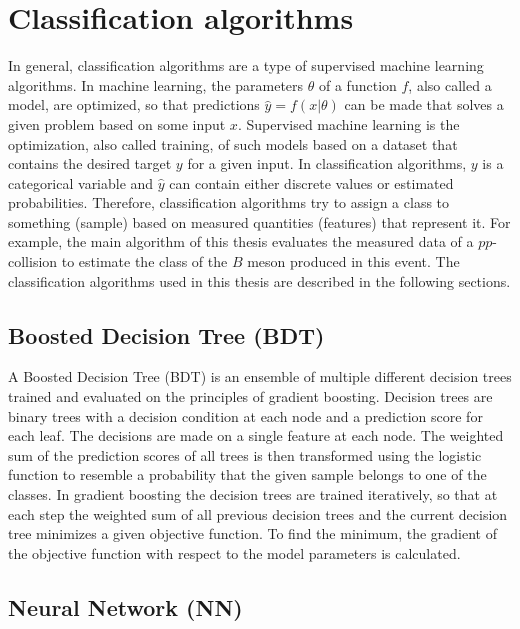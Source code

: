 \section{Classification algorithms} %

In general, classification algorithms are a type of supervised machine learning algorithms.
In machine learning, the parameters $\theta$ of a function $f$, also called a model, are optimized, so that predictions $\hat{y}=f(x|\theta)$ can be made that solves a given problem based on some input $x$.
Supervised machine learning is the optimization, also called training, of such models based on a dataset that contains the desired target $y$ for a given input. 
In classification algorithms, $y$ is a categorical variable and $\hat{y}$ can contain either discrete values or estimated probabilities. 
Therefore, classification algorithms try to assign a class to something (sample) based on measured quantities (features) that represent it. %
For example, the main algorithm of this thesis evaluates the measured data of a $pp$-collision to estimate the class of the $B$ meson produced in this event.
The classification algorithms used in this thesis are described in the following sections.

\subsection{Boosted Decision Tree (BDT)}
\label{sec:BDT}

A Boosted Decision Tree (BDT) is an ensemble of multiple different decision trees trained and evaluated on the principles of gradient boosting.
Decision trees are binary trees with a decision condition at each node and a prediction score for each leaf.
The decisions are made on a single feature at each node.
The weighted sum of the prediction scores of all trees is then transformed using the logistic function to resemble a probability that the given sample belongs to one of the classes.
In gradient boosting the decision trees are trained iteratively, so that at each step the weighted sum of all previous decision trees and the current decision tree minimizes a given objective function.
To find the minimum, the gradient of the objective function with respect to the model parameters is calculated.

\subsection{Neural Network (NN)}
\label{sec:NN}

